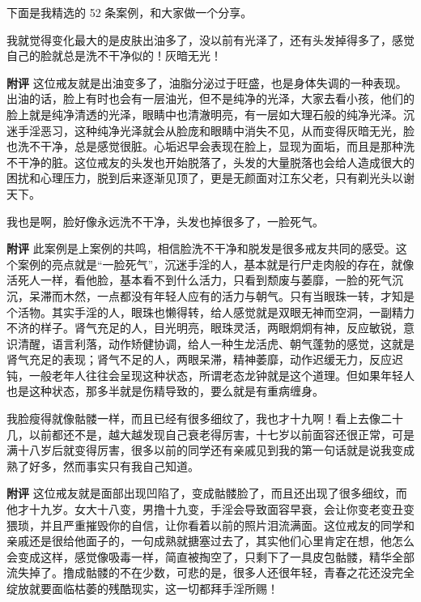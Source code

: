 下面是我精选的 52 条案例，和大家做一个分享。

\begin{case}[变丑]
    我就觉得变化最大的是皮肤出油多了，没以前有光泽了，还有头发掉得多了，感觉自己的脸就总是洗不干净似的！灰暗无光！

    \textbf{附评} 这位戒友就是出油变多了，油脂分泌过于旺盛，也是身体失调的一种表现。出油的话，脸上有时也会有一层油光，但不是纯净的光泽，大家去看小孩，他们的脸上就是纯净清透的光泽，眼睛中也清澈明亮，有一层如大理石般的纯净光泽。沉迷手淫恶习，这种纯净光泽就会从脸庞和眼睛中消失不见，从而变得灰暗无光，脸也洗不干净，总是感觉很脏。心垢迟早会表现在脸上，显现为面垢，而且是那种洗不干净的脏。这位戒友的头发也开始脱落了，头发的大量脱落也会给人造成很大的困扰和心理压力，脱到后来逐渐见顶了，更是无颜面对江东父老，只有剃光头以谢天下。
\end{case}

\begin{case}[变丑]
    我也是啊，脸好像永远洗不干净，头发也掉很多了，一脸死气。

    \textbf{附评} 此案例是上案例的共鸣，相信脸洗不干净和脱发是很多戒友共同的感受。这个案例的亮点就是“一脸死气”，沉迷手淫的人，基本就是行尸走肉般的存在，就像活死人一样，看他脸，基本看不到什么活力，只看到颓废与萎靡，一脸的死气沉沉，呆滞而木然，一点都没有年轻人应有的活力与朝气。只有当眼珠一转，才知是个活物。其实手淫的人，眼珠也懒得转，给人感觉就是双眼无神而空洞，一副精力不济的样子。肾气充足的人，目光明亮，眼珠灵活，两眼炯炯有神，反应敏锐，意识清醒，语言利落，动作矫健协调，给人一种生龙活虎、朝气蓬勃的感觉，这就是肾气充足的表现；肾气不足的人，两眼呆滞，精神萎靡，动作迟缓无力，反应迟钝，一般老年人往往会呈现这种状态，所谓老态龙钟就是这个道理。但如果年轻人也是这种状态，那多半就是伤精导致的，要么就是有重病缠身。
\end{case}

\begin{case}[变丑]
    我脸瘦得就像骷髅一样，而且已经有很多细纹了，我也才十九啊！看上去像二十几，以前都还不是，越大越发现自己衰老得厉害，十七岁以前面容还很正常，可是满十八岁后就变得厉害，很多以前的同学还有亲戚见到我的第一句话就是说我变成熟了好多，然而事实只有我自己知道。

    \textbf{附评} 这位戒友就是面部出现凹陷了，变成骷髅脸了，而且还出现了很多细纹，而他才十九岁。女大十八变，男撸十九变，手淫会导致面容早衰，会让你变老变丑变猥琐，并且严重摧毁你的自信，让你看着以前的照片泪流满面。这位戒友的同学和亲戚还是很给他面子的，一句成熟就搪塞过去了，其实他们心里肯定在想，他怎么会变成这样，感觉像吸毒一样，简直被掏空了，只剩下了一具皮包骷髅，精华全部流失掉了。撸成骷髅的不在少数，可悲的是，很多人还很年轻，青春之花还没完全绽放就要面临枯萎的残酷现实，这一切都拜手淫所赐！
\end{case}

